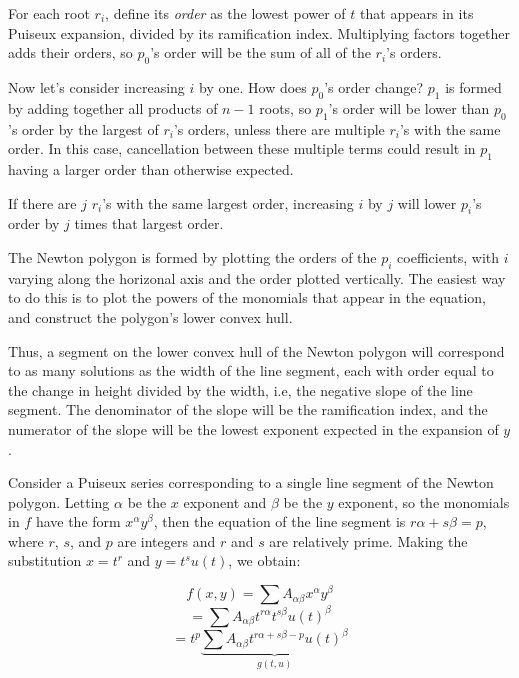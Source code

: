 For each root $r_i$, define its {\it order} as the lowest power of $t$
that appears in its Puiseux expansion, divided by its ramification
index.  Multiplying factors together adds their orders, so
$p_0$'s order will be the sum of all of the $r_i$'s orders.



Now let's consider increasing $i$ by one.  How does $p_0$'s order
change?  $p_1$ is formed by adding together all products of $n-1$
roots, so $p_1$'s order will be lower than $p_0$'s order by the
largest of $r_i$'s orders, unless there are multiple $r_i$'s with the
same order.  In this case, cancellation between these multiple terms
could result in $p_1$ having a larger order than otherwise expected.

If there are $j$ $r_i$'s with the same largest order, increasing $i$
by $j$ will lower $p_i$'s order by $j$ times that largest order.

The Newton polygon is formed by plotting the orders of the $p_i$
coefficients, with $i$ varying along the horizonal axis and the order
plotted vertically.  The easiest way to do this is to plot the powers
of the monomials that appear in the equation, and construct the
polygon's lower convex hull.

Thus, a segment on the lower convex hull of the Newton polygon will
correspond to as many solutions as the width of the line segment, each
with order equal to the change in height divided by the width, i.e,
the negative slope of the line segment.  The denominator of the slope
will be the ramification index, and the numerator of the slope will be
the lowest exponent expected in the expansion of $y$.

Consider a Puiseux series
corresponding to a single line segment of the Newton polygon.
Letting
$\alpha$ be the $x$ exponent and $\beta$ be the $y$ exponent, so the
monomials in $f$ have the form $x^\alpha y^\beta$, then the equation
of the line segment is $r\alpha + s\beta = p$, where $r$, $s$, and $p$
are integers and $r$ and $s$ are relatively prime.  Making the
substitution $x=t^r$ and $y=t^s u(t)$, we obtain:

$$f(x,y) = \sum A_{\alpha\beta} x^\alpha y^\beta$$
$$ = \sum A_{\alpha\beta} t^{r \alpha} t^{s \beta} u(t)^\beta$$
$$ = t^p \underbrace{\sum A_{\alpha\beta} t^{r \alpha + s \beta - p} u(t)^\beta}_{g(t,u)}$$

